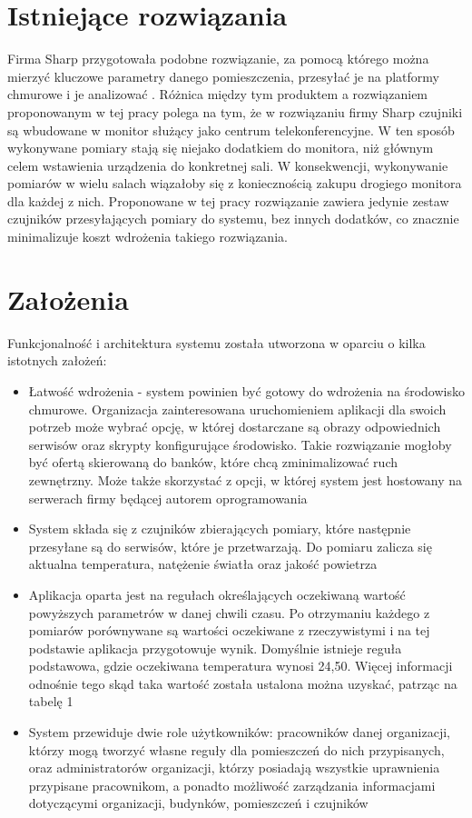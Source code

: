 \documentclass[11pt, a4]{article} %
\begin{document}
\section{Istniejące rozwiązania}
Firma Sharp przygotowała podobne rozwiązanie, za pomocą którego można mierzyć kluczowe 
parametry danego pomieszczenia, przesyłać je na platformy chmurowe i je analizować 
\parencite{sharp:2022am}. Różnica między tym produktem a rozwiązaniem proponowanym w tej pracy 
polega na tym, że w rozwiązaniu firmy Sharp czujniki są wbudowane w monitor służący 
jako centrum telekonferencyjne. W ten sposób wykonywane pomiary stają się niejako 
dodatkiem do monitora, niż głównym celem wstawienia urządzenia do konkretnej sali. 
W konsekwencji, wykonywanie pomiarów w wielu salach wiązałoby się z koniecznością 
zakupu drogiego monitora dla każdej z nich. Proponowane w tej pracy rozwiązanie zawiera 
jedynie zestaw czujników przesyłających pomiary do systemu, bez innych dodatków, co 
znacznie minimalizuje koszt wdrożenia takiego rozwiązania.
\section{Założenia}
Funkcjonalność i architektura systemu została utworzona w oparciu o kilka istotnych 
założeń:

\begin{itemize} %
    \item Łatwość wdrożenia - system powinien być gotowy do wdrożenia na środowisko 
    chmurowe. Organizacja zainteresowana uruchomieniem aplikacji dla swoich potrzeb 
    może wybrać opcję, w której dostarczane są obrazy odpowiednich serwisów oraz 
    skrypty konfigurujące środowisko. Takie rozwiązanie mogłoby być ofertą skierowaną 
    do banków, które chcą zminimalizować ruch zewnętrzny. Może także skorzystać z 
    opcji, w której system jest hostowany na serwerach firmy będącej autorem 
    oprogramowania
    \item System składa się z czujników zbierających pomiary, które następnie przesyłane 
    są do serwisów, które je przetwarzają. Do pomiaru zalicza się aktualna 
    temperatura, natężenie światła oraz jakość powietrza
    \item Aplikacja oparta jest na regułach określających oczekiwaną wartość powyższych 
    parametrów w danej chwili czasu. Po otrzymaniu każdego z pomiarów porównywane są 
    wartości oczekiwane z rzeczywistymi i na tej podstawie aplikacja przygotowuje wynik. 
    Domyślnie istnieje reguła podstawowa, gdzie oczekiwana temperatura wynosi 24,50. 
    Więcej informacji odnośnie tego skąd taka wartość została ustalona można 
    uzyskać, patrząc na tabelę 1
    \item System przewiduje dwie role użytkowników: pracowników danej 
    organizacji, którzy mogą tworzyć własne reguły dla pomieszczeń do nich 
    przypisanych, oraz administratorów organizacji, którzy posiadają wszystkie 
    uprawnienia przypisane pracownikom, a ponadto możliwość zarządzania informacjami 
    dotyczącymi organizacji, budynków, pomieszczeń i czujników
\end{itemize}
\end{document}
